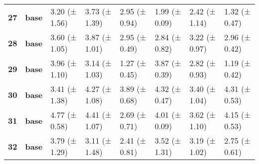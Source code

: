 \begin{longtable}{llllllll}
\cline{1-8}
\textbf{27} & \textbf{base} & 3.20 (± 1.56) & 3.73 (± 1.39) & 2.95 (± 0.94) & 1.99 (± 0.09) & 2.42 (± 1.14) & 1.32 (± 0.47) \\
\cline{1-8}
\textbf{28} & \textbf{base} & 3.60 (± 1.05) & 3.87 (± 1.01) & 2.95 (± 0.49) & 2.84 (± 0.82) & 3.22 (± 0.97) & 2.96 (± 0.42) \\
\cline{1-8}
\textbf{29} & \textbf{base} & 3.96 (± 1.10) & 3.14 (± 1.03) & 1.27 (± 0.45) & 3.87 (± 0.39) & 2.82 (± 0.93) & 1.19 (± 0.42) \\
\cline{1-8}
\textbf{30} & \textbf{base} & 3.41 (± 1.38) & 4.27 (± 1.08) & 3.89 (± 0.68) & 4.32 (± 0.47) & 3.40 (± 1.04) & 4.31 (± 0.53) \\
\cline{1-8}
\textbf{31} & \textbf{base} & 4.77 (± 0.58) & 4.41 (± 1.07) & 2.69 (± 0.71) & 4.01 (± 0.09) & 3.62 (± 1.10) & 4.15 (± 0.53) \\
\cline{1-8}
\textbf{32} & \textbf{base} & 3.79 (± 1.29) & 3.11 (± 1.48) & 2.41 (± 0.81) & 3.52 (± 1.31) & 3.19 (± 1.02) & 2.75 (± 0.61) \\
\cline{1-8}
\end{longtable}
